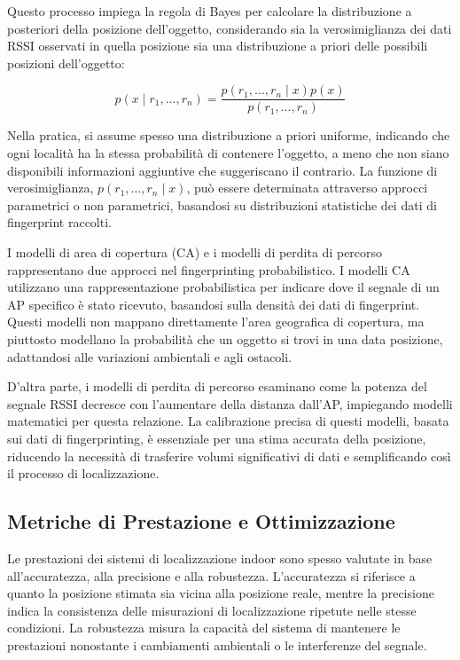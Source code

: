 \noindent Questo processo impiega la regola di Bayes per calcolare la distribuzione a posteriori della posizione dell'oggetto, considerando sia la verosimiglianza dei dati RSSI osservati in quella posizione sia una distribuzione a priori delle possibili posizioni dell'oggetto:

\begin{equation}
    p(x \mid r_1, ..., r_n) = \frac{p(r_1, ..., r_n \mid x) p(x)}{p(r_1, ..., r_n)}
\end{equation}

\noindent Nella pratica, si assume spesso una distribuzione a priori uniforme, indicando che ogni località ha la stessa probabilità di contenere l'oggetto, a meno che non siano disponibili informazioni aggiuntive che suggeriscano il contrario. La funzione di verosimiglianza, $ p(r_1, ..., r_n \mid x) $, può essere determinata attraverso approcci parametrici o non parametrici, basandosi su distribuzioni statistiche dei dati di fingerprint raccolti.

I modelli di area di copertura (CA) e i modelli di perdita di percorso rappresentano due approcci nel fingerprinting probabilistico. I modelli CA utilizzano una rappresentazione probabilistica per indicare dove il segnale di un AP specifico è stato ricevuto, basandosi sulla densità dei dati di fingerprint. Questi modelli non mappano direttamente l'area geografica di copertura, ma piuttosto modellano la probabilità che un oggetto si trovi in una data posizione, adattandosi alle variazioni ambientali e agli ostacoli.

D'altra parte, i modelli di perdita di percorso esaminano come la potenza del segnale RSSI decresce con l'aumentare della distanza dall'AP, impiegando modelli matematici per questa relazione. La calibrazione precisa di questi modelli, basata sui dati di fingerprinting, è essenziale per una stima accurata della posizione, riducendo la necessità di trasferire volumi significativi di dati e semplificando così il processo di localizzazione.

\subsection{Metriche di Prestazione e Ottimizzazione}
\hspace{\parindent}Le prestazioni dei sistemi di localizzazione indoor sono spesso valutate in base all'accuratezza, alla precisione e alla robustezza. L'accuratezza si riferisce a quanto la posizione stimata sia vicina alla posizione reale, mentre la precisione indica la consistenza delle misurazioni di localizzazione ripetute nelle stesse condizioni. La robustezza misura la capacità del sistema di mantenere le prestazioni nonostante i cambiamenti ambientali o le interferenze del segnale.

